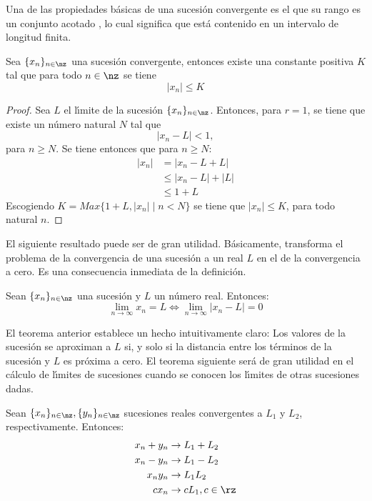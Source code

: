Una de las propiedades b\'{a}sicas de una sucesi\'{o}n convergente es el que
su rango es un conjunto acotado%
%
, lo cual significa que est\'{a} contenido en un intervalo de longitud finita.

\begin{theorem}
Sea $\{x_{n}\}_{n\in\nz}$ una sucesi\'{o}n convergente, entonces existe una
constante positiva $K$ tal que para todo $n\in\nz$ se tiene
\begin{equation}
|x_{n}|\leq K \label{acotada}%
\end{equation}

\end{theorem}

\begin{proof}
Sea $L$ el l\'{\i}mite de la sucesi\'{o}n $\{x_{n}\}_{n\in\nz}$. Entonces,
para $r=1$, se tiene que existe un n\'{u}mero natural $N$ tal que
\[
|x_{n}-L|<1,
\]
para $n\geq N$. Se tiene entonces que para $n\geq N$:
\begin{align*}
|x_{n}|  &  =|x_{n}-L+L|\\
&  \leq|x_{n}-L|+|L|\\
&  \leq1+L
\end{align*}
Escogiendo $K=Max\{1+L,|x_{n}|\mid n<N\}$ se tiene que $|x_{n}|\leq K$, para
todo natural $n$.
\end{proof}

El siguiente resultado puede ser de gran utilidad. B\'{a}sicamente, transforma
el problema de la convergencia de una sucesi\'{o}n a un real $L$ en el de la
convergencia a cero. Es una consecuencia inmediata de la definici\'{o}n.

\begin{theorem}
Sean $\{x_{n}\}_{n\in\nz}$ una sucesi\'{o}n y $L$ un n\'{u}mero real.
Entonces:
\begin{equation}
\lim_{n\rightarrow\infty}x_{n}=L\Longleftrightarrow\lim_{n\rightarrow\infty
}|x_{n}-L|=0
\end{equation}

\end{theorem}

El teorema anterior establece un hecho intuitivamente claro: Los valores de la
sucesi\'{o}n se aproximan a $L$ si, y solo si la distancia entre los
t\'{e}rminos de la sucesi\'{o}n y $L$ es pr\'{o}xima a cero. El teorema
siguiente ser\'{a} de gran utilidad en el c\'{a}lculo de l\'{\i}mites de
sucesiones cuando se conocen los l\'{\i}mites de otras sucesiones dadas.

\begin{theorem}%
%
\label{algebrasucesiones} Sean $\{x_{n}\}_{n\in\nz},\{y_{n}\}_{n\in\nz}$
sucesiones reales convergentes a $L_{1}$ y $L_{2}$, respectivamente.
Entonces:
\begin{align}
x_{n}+y_{n}  &  \rightarrow L_{1}+L_{2}\label{sumasucesion}\\
x_{n}-y_{n}  &  \rightarrow L_{1}-L_{2}\\
x_{n}y_{n}  &  \rightarrow L_{1}L_{2}\label{productosucesion}\\
cx_{n}  &  \rightarrow cL_{1},c\in\rz
\end{align}

\end{theorem}

